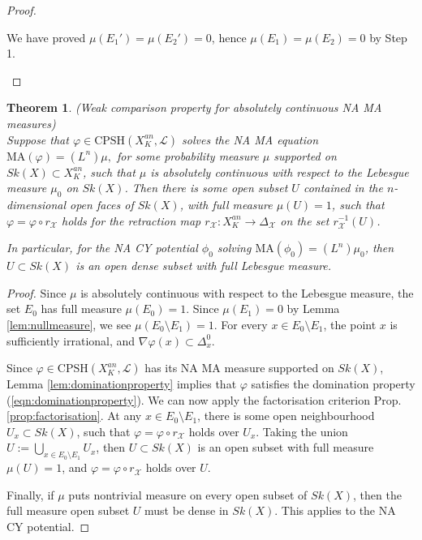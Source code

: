 \documentclass[a4paper]{article}
\newtheorem{thm}{Theorem}[section]
\theoremstyle{definition}
\begin{document}
\begin{proof}
\begin{enumerate}
	
	
		We have proved $\mu(E_1')= \mu(E_2')=0$, hence $\mu(E_1)=\mu(E_2)=0$ by Step 1.
		
		\end{enumerate}
		
		
	\end{proof}
	
	
	
	


\begin{thm}
(Weak comparison property for absolutely continuous NA MA 
measures)
\\
Suppose that $\varphi\in \text{CPSH}(X_K^{an},\mathcal{L})$ solves the NA MA equation
$
	\text{MA}(\varphi )=(L^n) \mu,
$
for some probability measure $\mu$ supported on $Sk(X)\subset X_K^{an}$, such that $\mu$ 
is \emph{absolutely continuous} with respect to 
the Lebesgue measure $\mu_0$ on $Sk(X)$. Then there is some open subset $U$ contained in the $n$-dimensional open faces of $Sk(X)$, with full measure $\mu(U)=1$, such that $\varphi= \varphi\circ r_{\mathcal{X}}$ holds for the retraction map $r_\mathcal{X}: X_K^{an}\to \Delta_\mathcal{X}$ on the set $r_\mathcal{X}^{-1}(U)$.


In particular, for the NA CY potential $\phi_0$ solving $\text{MA}(\phi_0)= (L^n)\mu_0$, then $U\subset Sk(X)$ is an open dense subset with full Lebesgue measure.
\end{thm}
	

	
	
	
	\begin{proof}
	Since $\mu$ is absolutely continuous with respect to the Lebesgue measure, the set $E_0$ has full measure $\mu(E_0)=1$. Since $\mu(E_1)=0$ by Lemma \ref{lem:nullmeasure}, we see $\mu(E_0\setminus E_1)=1$. For every $x\in E_0\setminus E_1$, the point $x$ is sufficiently irrational, and $\nabla \varphi(x) \subset \Delta_x^0$. 
	
	
	Since $\varphi\in \text{CPSH}(X_K^{an},\mathcal{L})$ has its NA MA measure supported on $Sk(X)$, Lemma \ref{lem:dominationproperty} implies that $\varphi$ satisfies the domination property (\ref{eqn:dominationproperty}). We can now apply the factorisation criterion Prop. \ref{prop:factorisation}. At any $x\in E_0\setminus E_1$, there is some open neighbourhood $U_x\subset Sk(X)$, such that $\varphi= \varphi\circ r_{\mathcal{X}}$ holds over $U_x$. Taking the union $U:= \bigcup_{x\in E_0\setminus E_1} U_x$, then $U\subset Sk(X)$ is an open subset with full measure $\mu(U)=1$, and $\varphi= \varphi\circ r_{\mathcal{X}}$ holds over $U$.
	
	
	
	
	
	
	
	
	
	Finally, if  $\mu$ puts nontrivial measure on every open subset of $Sk(X)$, then the full measure open subset $U$ must be dense in $Sk(X)$. This applies to the NA CY potential.
	\end{proof}
	
\end{document}
